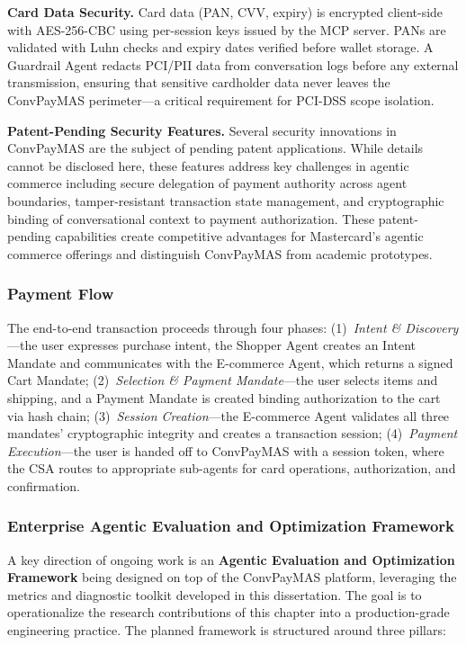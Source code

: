 \textbf{Card Data Security.} Card data (PAN, CVV, expiry) is encrypted client-side with AES-256-CBC using per-session keys issued by the MCP server. PANs are validated with Luhn checks and expiry dates verified before wallet storage. A Guardrail Agent redacts PCI/PII data from conversation logs before any external transmission, ensuring that sensitive cardholder data never leaves the ConvPayMAS perimeter---a critical requirement for PCI-DSS scope isolation.

\textbf{Patent-Pending Security Features.} Several security innovations in ConvPayMAS are the subject of pending patent applications. While details cannot be disclosed here, these features address key challenges in agentic commerce including secure delegation of payment authority across agent boundaries, tamper-resistant transaction state management, and cryptographic binding of conversational context to payment authorization. These patent-pending capabilities create competitive advantages for Mastercard's agentic commerce offerings and distinguish ConvPayMAS from academic prototypes.

\subsubsection{Payment Flow}

The end-to-end transaction proceeds through four phases: (1)~\textit{Intent \& Discovery}---the user expresses purchase intent, the Shopper Agent creates an Intent Mandate and communicates with the E-commerce Agent, which returns a signed Cart Mandate; (2)~\textit{Selection \& Payment Mandate}---the user selects items and shipping, and a Payment Mandate is created binding authorization to the cart via hash chain; (3)~\textit{Session Creation}---the E-commerce Agent validates all three mandates' cryptographic integrity and creates a transaction session; (4)~\textit{Payment Execution}---the user is handed off to ConvPayMAS with a session token, where the CSA routes to appropriate sub-agents for card operations, authorization, and confirmation.

\subsubsection{Enterprise Agentic Evaluation and Optimization Framework}

A key direction of ongoing work is an \textbf{Agentic Evaluation and Optimization Framework} being designed on top of the ConvPayMAS platform, leveraging the metrics and diagnostic toolkit developed in this dissertation. The goal is to operationalize the research contributions of this chapter into a production-grade engineering practice. The planned framework is structured around three pillars:

